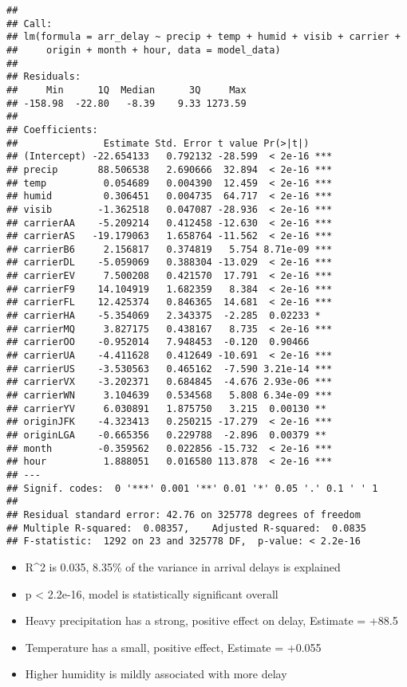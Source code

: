 \documentclass[
]{article}
\begin{document}
\begin{verbatim}
## 
## Call:
## lm(formula = arr_delay ~ precip + temp + humid + visib + carrier + 
##     origin + month + hour, data = model_data)
## 
## Residuals:
##     Min      1Q  Median      3Q     Max 
## -158.98  -22.80   -8.39    9.33 1273.59 
## 
## Coefficients:
##               Estimate Std. Error t value Pr(>|t|)    
## (Intercept) -22.654133   0.792132 -28.599  < 2e-16 ***
## precip       88.506538   2.690666  32.894  < 2e-16 ***
## temp          0.054689   0.004390  12.459  < 2e-16 ***
## humid         0.306451   0.004735  64.717  < 2e-16 ***
## visib        -1.362518   0.047087 -28.936  < 2e-16 ***
## carrierAA    -5.209214   0.412458 -12.630  < 2e-16 ***
## carrierAS   -19.179063   1.658764 -11.562  < 2e-16 ***
## carrierB6     2.156817   0.374819   5.754 8.71e-09 ***
## carrierDL    -5.059069   0.388304 -13.029  < 2e-16 ***
## carrierEV     7.500208   0.421570  17.791  < 2e-16 ***
## carrierF9    14.104919   1.682359   8.384  < 2e-16 ***
## carrierFL    12.425374   0.846365  14.681  < 2e-16 ***
## carrierHA    -5.354069   2.343375  -2.285  0.02233 *  
## carrierMQ     3.827175   0.438167   8.735  < 2e-16 ***
## carrierOO    -0.952014   7.948453  -0.120  0.90466    
## carrierUA    -4.411628   0.412649 -10.691  < 2e-16 ***
## carrierUS    -3.530563   0.465162  -7.590 3.21e-14 ***
## carrierVX    -3.202371   0.684845  -4.676 2.93e-06 ***
## carrierWN     3.104639   0.534568   5.808 6.34e-09 ***
## carrierYV     6.030891   1.875750   3.215  0.00130 ** 
## originJFK    -4.323413   0.250215 -17.279  < 2e-16 ***
## originLGA    -0.665356   0.229788  -2.896  0.00379 ** 
## month        -0.359562   0.022856 -15.732  < 2e-16 ***
## hour          1.888051   0.016580 113.878  < 2e-16 ***
## ---
## Signif. codes:  0 '***' 0.001 '**' 0.01 '*' 0.05 '.' 0.1 ' ' 1
## 
## Residual standard error: 42.76 on 325778 degrees of freedom
## Multiple R-squared:  0.08357,    Adjusted R-squared:  0.0835 
## F-statistic:  1292 on 23 and 325778 DF,  p-value: < 2.2e-16
\end{verbatim}

\begin{itemize}
\item
  R\^{}2 is 0.035, 8.35\% of the variance in arrival delays is explained
\item
  p \textless{} 2.2e-16, model is statistically significant overall
\item
  Heavy precipitation has a strong, positive effect on delay, Estimate =
  +88.5
\item
  Temperature has a small, positive effect, Estimate = +0.055
\item
  Higher humidity is mildly associated with more delay
\end{itemize}
\end{document}

